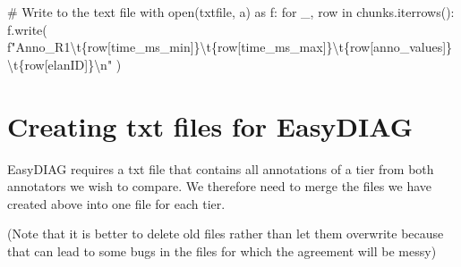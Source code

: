 \documentclass[
  letterpaper,
  DIV=11,
  numbers=noendperiod]{scrreprt}
\newenvironment{Shaded}{\begin{snugshade}}{\end{snugshade}}
\newcommand{\BuiltInTok}[1]{\textcolor[rgb]{0.00,0.23,0.31}{#1}}
\newcommand{\CharTok}[1]{\textcolor[rgb]{0.13,0.47,0.30}{#1}}
\newcommand{\CommentTok}[1]{\textcolor[rgb]{0.37,0.37,0.37}{#1}}
\newcommand{\ControlFlowTok}[1]{\textcolor[rgb]{0.00,0.23,0.31}{#1}}
\newcommand{\ImportTok}[1]{\textcolor[rgb]{0.00,0.46,0.62}{#1}}
\newcommand{\KeywordTok}[1]{\textcolor[rgb]{0.00,0.23,0.31}{#1}}
\newcommand{\NormalTok}[1]{\textcolor[rgb]{0.00,0.23,0.31}{#1}}
\newcommand{\SpecialCharTok}[1]{\textcolor[rgb]{0.37,0.37,0.37}{#1}}
\newcommand{\SpecialStringTok}[1]{\textcolor[rgb]{0.13,0.47,0.30}{#1}}
\newcommand{\StringTok}[1]{\textcolor[rgb]{0.13,0.47,0.30}{#1}}
\begin{document}
\begin{Shaded}
\begin{Highlighting}[]
        \CommentTok{\# Write to the text file}
        \ControlFlowTok{with} \BuiltInTok{open}\NormalTok{(txtfile, }\StringTok{\textquotesingle{}a\textquotesingle{}}\NormalTok{) }\ImportTok{as}\NormalTok{ f:}
            \ControlFlowTok{for}\NormalTok{ \_, row }\KeywordTok{in}\NormalTok{ chunks.iterrows():}
\NormalTok{                f.write(}
                    \SpecialStringTok{f"Anno\_R1}\CharTok{\textbackslash{}t}\SpecialCharTok{\{}\NormalTok{row[}\StringTok{\textquotesingle{}time\_ms\_min\textquotesingle{}}\NormalTok{]}\SpecialCharTok{\}}\CharTok{\textbackslash{}t}\SpecialCharTok{\{}\NormalTok{row[}\StringTok{\textquotesingle{}time\_ms\_max\textquotesingle{}}\NormalTok{]}\SpecialCharTok{\}}\CharTok{\textbackslash{}t}\SpecialCharTok{\{}\NormalTok{row[}\StringTok{\textquotesingle{}anno\_values\textquotesingle{}}\NormalTok{]}\SpecialCharTok{\}}\CharTok{\textbackslash{}t}\SpecialCharTok{\{}\NormalTok{row[}\StringTok{\textquotesingle{}elanID\textquotesingle{}}\NormalTok{]}\SpecialCharTok{\}}\CharTok{\textbackslash{}n}\SpecialStringTok{"}
\NormalTok{                )}
\end{Highlighting}
\end{Shaded}


\chapter{Creating txt files for
EasyDIAG}\label{creating-txt-files-for-easydiag}

EasyDIAG requires a txt file that contains all annotations of a tier
from both annotators we wish to compare. We therefore need to merge the
files we have created above into one file for each tier.

(Note that it is better to delete old files rather than let them
overwrite because that can lead to some bugs in the files for which the
agreement will be messy)
\end{document}
